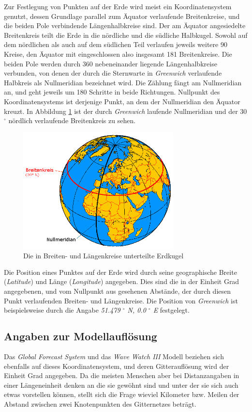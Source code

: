 Zur Festlegung von Punkten auf der Erde wird meist ein
Koordinatensystem genutzt, dessen Grundlage parallel zum Äquator
verlaufende Breitenkreise, und die beiden Pole verbindende
Längenhalbkreise sind. Der am Äquator angesiedelte Breitenkreis teilt
die Erde in die nördliche und die südliche Halbkugel. Sowohl auf dem
nördlichen als auch auf dem südlichen Teil verlaufen jeweils weitere
90 Kreise, den Äquator mit eingeschlossen also insgesamt 181
Breitenkreise. Die beiden Pole werden durch 360 nebeneinander liegende
Längenhalbkreise verbunden, von denen der durch die Sternwarte in
\textit{Greenwich} verlaufende Halbkreis als Nullmeridian bezeichnet
wird. Die Zählung fängt am Nullmeridian an, und geht jeweils um 180
Schritte in beide Richtungen. Nullpunkt des Koordinatensystems ist
derjenige Punkt, an dem der Nullmeridian den Äquator kreuzt. In
Abbildung \ref{koordinaten} ist der durch \textit{Greenwich} laufende
Nullmeridian und der 30 $^\circ$ nördlich verlaufende Breitenkreis zu
sehen.

\begin{figure}[h]
  \includegraphics[width=310px]{bilder/koordinaten}
  \caption{Die in Breiten- und Längenkreise unterteilte Erdkugel}
  \label{koordinaten}
\end{figure}

Die Position eines Punktes auf der Erde wird durch seine geographische
Breite (\textit{Latitude}) und Länge (\textit{Longitude})
angegeben. Dies sind die in der Einheit Grad angegebenen, und vom
Nullpunkt aus gesehenen Abstände, der durch diesen Punkt verlaufenden
Breiten- und Längenkreise. Die Position von \textit{Greenwich} ist
beispielsweise durch die Angabe \textit{51.479 $^\circ$ N, 0.0
  $^\circ$ E} festgelegt.


\subsection{Angaben zur Modellauflösung}
Das \textit{Global Forecast System} und das \textit{Wave Watch III}
Modell beziehen sich ebenfalls auf dieses Koordinatensystem, und deren
Gitterauflösung wird der Einheit Grad angegeben. Da die meisten
Menschen aber bei Distanzangaben in einer Längeneinheit denken an die
sie gewöhnt sind und unter der sie sich auch etwas vorstellen können,
stellt sich die Frage wieviel Kilometer bzw. Meilen der Abstand
zwischen zwei Knotenpunkten des Gitternetzes beträgt.


